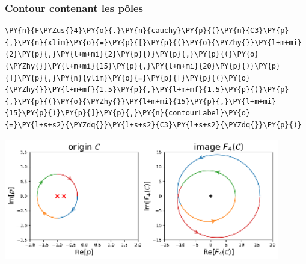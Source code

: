 \subsubsection{Contour contenant les pôles}
\begin{tcolorbox}[breakable, size=fbox, boxrule=1pt, pad at break*=1mm,colback=cellbackground, colframe=cellborder]
\begin{Verbatim}[commandchars=\\\{\}]
\PY{n}{F\PYZus{}4}\PY{o}{.}\PY{n}{cauchy}\PY{p}{(}\PY{n}{C3}\PY{p}{,}\PY{n}{xlim}\PY{o}{=}\PY{p}{[}\PY{p}{(}\PY{o}{\PYZhy{}}\PY{l+m+mi}{2}\PY{p}{,}\PY{l+m+mi}{2}\PY{p}{)}\PY{p}{,}\PY{p}{(}\PY{o}{\PYZhy{}}\PY{l+m+mi}{15}\PY{p}{,}\PY{l+m+mi}{20}\PY{p}{)}\PY{p}{]}\PY{p}{,}\PY{n}{ylim}\PY{o}{=}\PY{p}{[}\PY{p}{(}\PY{o}{\PYZhy{}}\PY{l+m+mf}{1.5}\PY{p}{,}\PY{l+m+mf}{1.5}\PY{p}{)}\PY{p}{,}\PY{p}{(}\PY{o}{\PYZhy{}}\PY{l+m+mi}{15}\PY{p}{,}\PY{l+m+mi}{15}\PY{p}{)}\PY{p}{]}\PY{p}{,}\PY{n}{contourLabel}\PY{o}{=}\PY{l+s+s2}{\PYZdq{}}\PY{l+s+s2}{C3}\PY{l+s+s2}{\PYZdq{}}\PY{p}{)}
\end{Verbatim}
\end{tcolorbox}
\begin{center}
    \includegraphics[width=0.9\textwidth]{notebook/fig/output_42_1.eps}
\end{center}
